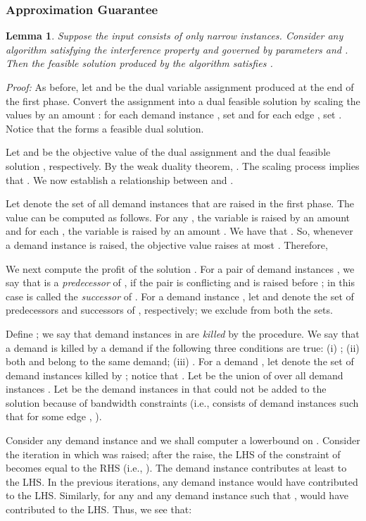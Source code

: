 \documentclass[11pt]{article}
\newtheorem{lemma}[theorem]{\bf Lemma}
\newcommand{\proof} {{\it Proof: }}
\begin{document}
\subsubsection*{Approximation Guarantee}
\begin{lemma}
\label{lem:JJJ}
Suppose the input consists of only narrow instances.
Consider any algorithm satisfying the interference property and governed by parameters  and .
Then the feasible solution  produced by the algorithm satisfies 
.
\end{lemma}
\proof
As before, let  and  be the dual variable assignment produced at the end of the first phase.
Convert the assignment  into a dual feasible solution
by scaling the values by an amount :
for each demand instance , set  and 
for each edge , set .
Notice that the  forms a feasible dual solution.

Let  and  be the objective
value of the dual assignment 
and the dual feasible solution ,
respectively. By the weak duality theorem, .
The scaling process implies that .
We now establish a relationship between  and .

Let  denote the set of all demand instances that are raised in the first phase.
The value  can be computed as follows.
For any , the variable  is raised by an amount 
and for each , the variable  is raised by an amount .
We have that .
So, whenever a demand instance  is raised, the objective value raises at most .
Therefore,


We next compute the profit of the solution .
For a pair of demand instances , we say that  is a {\em predecessor} of ,
if the pair is conflicting and  is raised before ;
in this case  is called the {\em successor} of .
For a demand instance , let  and  denote the set of predecessors and successors of ,
respectively; we exclude  from both the sets.

Define ; we say that demand instances in  are {\em killed} by the procedure.
We say that a demand  is killed by a demand  if the following three conditions are true: (i) ;
(ii) both  and  belong to the same demand;  (iii) .
For a demand , let  denote the set of demand instances killed by ; 
notice that .
Let  be the union of  over all demand instances .
Let  be the demand instances in  that could not be added to the solution because of bandwidth constraints
(i.e.,  consists of demand instances  such that for some edge , 
).

Consider any demand instance  and we shall computer a lowerbound on .
Consider the iteration in which  was raised; after the raise, the LHS of the constraint
of  becomes equal to the RHS (i.e., ). 
The demand instance  contributes at least  to the LHS.
In the previous iterations, any demand instance  would have contributed  to the LHS.
Similarly, for any  and any demand instance  such that ,
 would have contributed  to the LHS. Thus, we see that:
\end{document}

